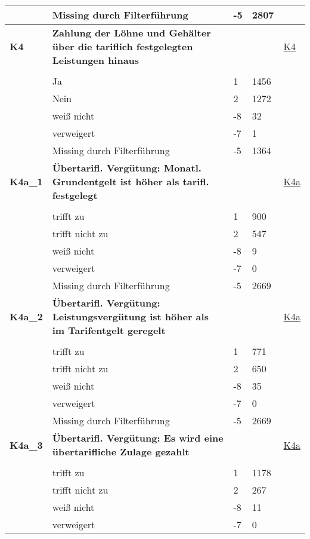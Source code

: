 \begin{longtable}{| L{2.5cm} | L{8.25cm}| C{1.5cm} | R{1.25cm} | C{2.25cm} |  }
   & Missing durch Filterführung & -5 & 2807 &  \\ 
   \midrule
\textbf{K4}\label{var:suf:K4} & \textbf{Zahlung der Löhne und Gehälter über die tariflich festgelegten Leistungen hinaus} &  &  & \hyperref[K4]{K4} \\ 
   &  &  &  &  \\ 
   & Ja & 1 & 1456 &  \\ 
   & Nein & 2 & 1272 &  \\ 
   & weiß nicht & -8 & 32 &  \\ 
   & verweigert & -7 & 1 &  \\ 
   & Missing durch Filterführung & -5 & 1364 &  \\ 
   \midrule
\textbf{K4a\_1}\label{var:suf:K4a:1} & \textbf{Übertarifl. Vergütung: Monatl. Grundentgelt ist höher als tarifl. festgelegt} &  &  & \hyperref[K4a]{K4a} \\ 
   &  &  &  &  \\ 
   & trifft zu & 1 & 900 &  \\ 
   & trifft nicht zu & 2 & 547 &  \\ 
   & weiß nicht & -8 & 9 &  \\ 
   & verweigert & -7 & 0 &  \\ 
   & Missing durch Filterführung & -5 & 2669 &  \\ 
   \midrule
\textbf{K4a\_2}\label{var:suf:K4a:2} & \textbf{Übertarifl. Vergütung: Leistungsvergütung ist höher als im Tarifentgelt geregelt} &  &  & \hyperref[K4a]{K4a} \\ 
   &  &  &  &  \\ 
   & trifft zu & 1 & 771 &  \\ 
   & trifft nicht zu & 2 & 650 &  \\ 
   & weiß nicht & -8 & 35 &  \\ 
   & verweigert & -7 & 0 &  \\ 
   & Missing durch Filterführung & -5 & 2669 &  \\ 
   \midrule
\textbf{K4a\_3}\label{var:suf:K4a:3} & \textbf{Übertarifl. Vergütung: Es wird eine übertarifliche Zulage gezahlt} &  &  & \hyperref[K4a]{K4a} \\ 
   &  &  &  &  \\ 
   & trifft zu & 1 & 1178 &  \\ 
   & trifft nicht zu & 2 & 267 &  \\ 
   & weiß nicht & -8 & 11 &  \\ 
   & verweigert & -7 & 0 &  \\ 

\end{longtable}
